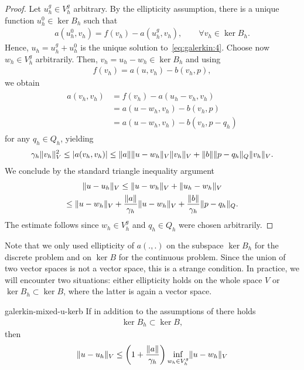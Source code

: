 \begin{proof}
  Let $u_h^g \in V_h^g$ arbitrary. By the ellipticity assumption,
  there is a unique function $u_h^0\in \ker{B_h}$ such that
  \begin{gather*}
    a(u_h^0,v_h) = f(v_h) - a(u_h^g,v_h),
    \qquad\forall v_h\in \ker{B_h}.
  \end{gather*}
  Hence, $u_h = u_h^g + u_h^0$ is the unique solution
  to~\eqref{eq:galerkin:4}. Choose now $w_h\in V_h^g$
  arbitrarily. Then, $v_h = u_h-w_h\in \ker{B_h}$ and using
  \begin{gather*}
    f(v_h) = a(u, v_h) - b(v_h, p),
  \end{gather*}
  we obtain
  \begin{gather}
    \begin{split}
      \label{eq:galerkin:9}
      a(v_h, v_h)
      &= f(v_h) - a(u_h-v_h, v_h) \\
      &= a(u-w_h, v_h) - b(v_h, p) \\
      &= a(u-w_h, v_h) - b(v_h, p-q_h)
    \end{split}
  \end{gather}
  for any $q_h\in Q_h$, yielding
  \begin{gather*}
    \gamma_h\lVert v_h\rVert^2_V
    \le \lvert a(v_h, v_h)\rvert
    \le \lVert a\rVert \lVert u-w_h\rVert_V \lVert v_h\rVert_V
      + \lVert b\rVert \lVert p-q_h\rVert_Q \lVert v_h\rVert_V.
  \end{gather*}
  We conclude by the standard triangle inequality argument
  \begin{multline*}
    \lVert u-u_h\rVert_V \le \lVert u-w_h\rVert_V + \lVert u_h-w_h\rVert_V
    \\
    \le \lVert u-w_h\rVert_V + \frac{\lVert a\rVert}{\gamma_h} \lVert u-w_h\rVert_V
    + \frac{\lVert b\rVert}{\gamma_h} \lVert p-q_h\rVert_Q.
  \end{multline*}
  The estimate follows since $w_h\in V_h^g$ and $q_h\in Q_h$ were
  chosen arbitrarily.
\end{proof}

\begin{remark}
  Note that we only used ellipticity of $a(.,.)$ on the subspace
  $\ker{B_h}$ for the discrete problem and on $\ker B$ for the
  continuous problem. Since the union of two vector spaces is not a
  vector space, this is a strange condition. In practice, we will
  encounter two situations: either ellipticity holds on the whole
  space $V$ or $\ker{B_h}\subset\ker{B}$, where the latter is again a
  vector space.
\end{remark}

\begin{Corollary}{galerkin-mixed-u-kerb}
  If in addition to the assumptions of
   there holds
  \begin{gather}
    \label{eq:galerkin:6}
    \ker{B_h}\subset \ker B,
  \end{gather}
  then
  \begin{gather}
    \label{eq:galerkin:7}
    \lVert u-u_h\rVert_V \le \left(1+\frac{\lVert a\rVert}{\gamma_h}\right)
    \inf_{w_h\in V_h^g}\lVert u-w_h\rVert_V
  \end{gather}
\end{Corollary}

